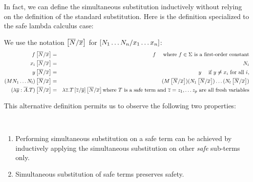 In fact, we can define the simultaneous substitution inductively
without relying on the definition of the standard substitution. Here
is the definition specialized to the safe lambda calculus case:

\begin{dfn}
\label{dnf:safe_simsubst}
 We use the notation
$\left[ \overline{N}/\overline{x} \right]$ for $\left[ N_1 \ldots N_n/x_1
\ldots x_n \right]$:
\begin{eqnarray*}
f \left[ \overline{N}/\overline{x} \right] &=& f \quad \mbox{ where $f\in\Sigma$ is a first-order constant} \\
x_i \left[ \overline{N}/\overline{x} \right] &=& N_i\\
 y \left[ \overline{N}/\overline{x} \right] &=& y \quad \mbox{ if } y \not \neq x_i \mbox{ for all } i,\\
(M N_1 \ldots N_l) \left[ \overline{N}/\overline{x} \right] &=& (M \left[ \overline{N}/\overline{x} \right]) (N_1 \left[ \overline{N}/\overline{x} \right]) \ldots  (N_l \left[ \overline{N}/\overline{x} \right])\\
(\lambda \overline{y} : \overline{A}. T)
\left[ \overline{N}/\overline{x} \right] &=& \lambda \overline{z} . T
\left[ \overline{z}/\overline{y} \right]
\left[ \overline{N}/\overline{x} \right] \mbox{where $T$ is a safe term
and $\overline{z} = z_1, \ldots z_p$ are all fresh variables}
\end{eqnarray*}
\end{dfn}

This alternative definition permits us to observe the following two
properties:

\begin{property}
\label{prop:subst_preserve_safety} \
\begin{enumerate}
\item Performing simultaneous substitution on a safe term can be
achieved by inductively applying the simultaneous substitution on
other \emph{safe} sub-terms only.

\item Simultaneous substitution of safe terms preserves safety.
\end{enumerate}
\end{property}

